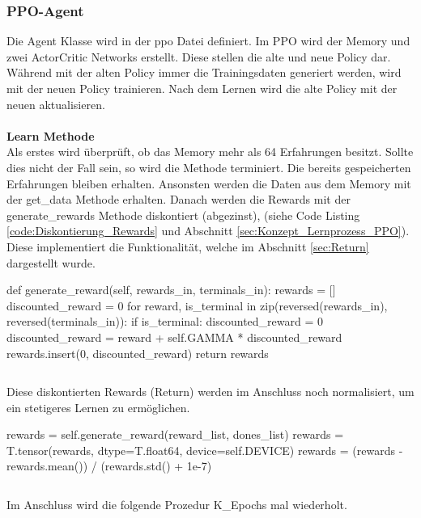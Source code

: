 \subsubsection{PPO-Agent} \label{sec:Implementierung_PPO_Agent}
Die Agent Klasse wird in der ppo Datei definiert.
Im PPO wird der Memory und zwei ActorCritic Networks erstellt. Diese stellen die alte und neue Policy dar. Während mit der alten Policy immer die Trainingsdaten generiert werden, wird mit der neuen Policy trainieren. Nach dem Lernen wird die alte Policy mit der neuen aktualisieren.\\
\\\textbf{Learn Methode} \label{sec:Implementierung_learn_PPO}\\
Als erstes wird überprüft, ob das Memory mehr als 64 Erfahrungen besitzt. Sollte dies nicht der Fall sein, so wird die Methode terminiert. Die bereits gespeicherten Erfahrungen bleiben erhalten.
Ansonsten werden die Daten aus dem Memory mit der get\_data Methode erhalten.
Danach werden die Rewards mit der generate\_rewards Methode diskontiert (abgezinst), (siehe Code Listing \ref{code:Diskontierung_Rewards} und Abschnitt \ref{sec:Konzept_Lernprozess_PPO}). Diese implementiert die Funktionalität, welche im Abschnitt \ref{sec:Return} dargestellt wurde.
\begin{python}
def generate_reward(self, rewards_in, terminals_in):
	rewards = []
	discounted_reward = 0
	for reward, is_terminal in zip(reversed(rewards_in), reversed(terminals_in)):
		if is_terminal:
			discounted_reward = 0
		discounted_reward = reward + self.GAMMA * discounted_reward
		rewards.insert(0, discounted_reward)
	return rewards
\end{python}
\begin{lstlisting}[caption=Diskontierung der Rewards, label=code:Diskontierung_Rewards]
\end{lstlisting}
Diese diskontierten Rewards (Return) werden im Anschluss noch normalisiert, um ein stetigeres Lernen zu ermöglichen.
\begin{python}
rewards = self.generate_reward(reward_list, dones_list)
rewards = T.tensor(rewards, dtype=T.float64, device=self.DEVICE)
rewards = (rewards - rewards.mean()) / (rewards.std() + 1e-7)
\end{python}
\begin{lstlisting}[caption=Normalisierung der diskontierten Rewards, label=code:Normalisierung_Diskontierung_Rewards]
\end{lstlisting}
Im Anschluss wird die folgende Prozedur K\_Epochs mal wiederholt.\\
